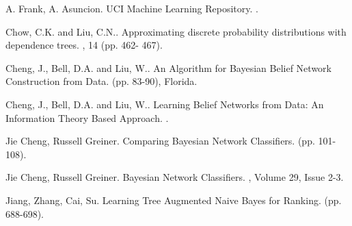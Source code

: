 \documentclass[twoside,twocolumn]{article}
\begin{document}
\begin{thebibliography}{99} %

A. Frank, A. Asuncion.
\newblock UCI Machine Learning Repository.
.

Chow, C.K. and Liu, C.N..
\newblock Approximating discrete probability distributions with dependence trees.
, 14 (pp. 462- 467).

Cheng, J., Bell, D.A. and Liu, W..
\newblock An Algorithm for Bayesian Belief Network Construction from Data.
 (pp. 83-90), Florida.

Cheng, J., Bell, D.A. and Liu, W..
\newblock Learning Belief Networks from Data: An Information Theory Based Approach.
.

Jie Cheng, Russell Greiner.
\newblock Comparing Bayesian Network Classifiers.
 (pp. 101-108).

Jie Cheng, Russell Greiner.
\newblock Bayesian Network Classifiers.
, Volume 29, Issue 2-3.

Jiang, Zhang, Cai, Su.
\newblock Learning Tree Augmented Naive Bayes for Ranking.
 (pp. 688-698). 

\end{thebibliography}

\end{document}
